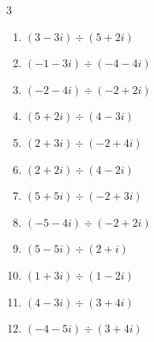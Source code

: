 \begin{multicols}{3}
\begin{enumerate}
  \item $\displaystyle (3-3i)\div(5+2i)$


  \item $\displaystyle (-1-3i)\div(-4-4i)$


  \item $\displaystyle (-2-4i)\div(-2+2i)$


  \item $\displaystyle (5+2i)\div(4-3i)$


  \item $\displaystyle (2+3i)\div(-2+4i)$


\columnbreak %

\resetques

  \item $\displaystyle (2+2i)\div(4-2i)$


  \item $\displaystyle (5+5i)\div(-2+3i)$


  \item $\displaystyle (-5-4i)\div(-2+2i)$


  \item $\displaystyle (5-5i)\div(2+i)$

        \phantom{$\displaystyle =1-3i$}

  \item $\displaystyle (1+3i)\div(1-2i)$

        \phantom{$\displaystyle =-1+i$}

  \item $\displaystyle (4-3i)\div(3+4i)$

        \phantom{$\displaystyle =-i$}

  \item $\displaystyle (-4-5i)\div(3+4i)$


\end{enumerate}
\end{multicols}
